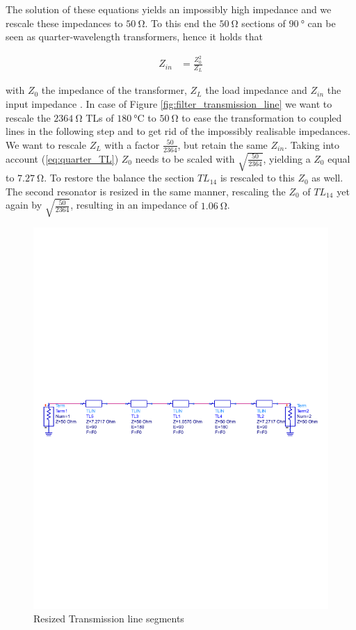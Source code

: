 \documentclass[a4paper]{article}        %
\begin{document}
  The solution of these equations yields an impossibly high impedance and we rescale these impedances to $\SI{50}{\ohm}$. To this end the $\SI{50}{\ohm}$ sections of $\SI{90}{\degree}$ can be seen as quarter-wavelength transformers, hence it holds that

  \begin{align}
  	Z_{in} &= \frac{Z_0^2}{Z_L}
  \label{eq:quarter_TL}
  \end{align}

  with $Z_0$ the impedance of the transformer, $Z_L$ the load impedance and $Z_{in}$ the input impedance \cite{pozar}. In case of Figure \ref{fig:filter_transmission_line} we want to rescale the $\SI{2364}{\ohm}$ TLs of $\SI{180}{\celsius}$ to $\SI{50}{\ohm}$ to ease the transformation to coupled lines in the following step and to get rid of the impossibly realisable impedances. We want to rescale $Z_L$ with a factor $\frac{50}{2364}$, but retain the same $Z_{in}$. Taking into account (\ref{eq:quarter_TL}) $Z_0$ needs to be scaled with $\sqrt{\frac{50}{2364}}$, yielding a $Z_0$ equal to $\SI{7.27}{\ohm}$.
  To restore the balance the section $TL_{14}$ is rescaled to this $Z_0$ as well.
  The second resonator is resized in the same manner, rescaling the $Z_0$ of $TL_{14}$ yet again by $\sqrt{\frac{50}{2364}}$, resulting in an impedance of $\SI{1.06}{\ohm}$.

  \begin{figure}[H]
    \centering
    \includegraphics[width=\textwidth]{fig/Filter/2nd_order/bandpass_TL_rescaled_imp.pdf}
    \caption{Resized Transmission line segments}
    \label{fig:filter_transmission_resized}
  \end{figure}
\end{document}
